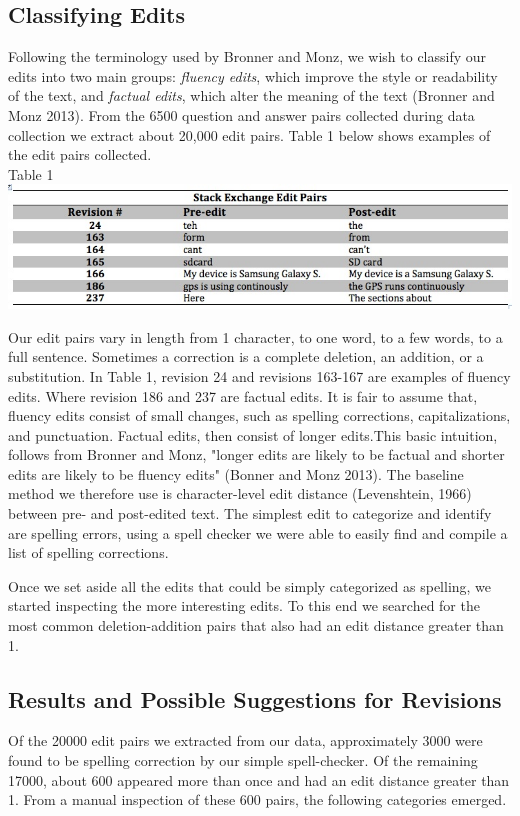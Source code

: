 \documentclass[11pt, oneside]{article}   	%
\begin{document}
\subsection{Classifying Edits} 
Following the terminology used by Bronner and Monz, we wish to classify our edits into two main groups:{ \itshape fluency edits}, which improve the style or readability of the text, and {\itshape factual edits}, which alter the meaning of the text (Bronner and Monz 2013).   From the 6500 question and answer pairs collected during data collection we extract about 20,000 edit pairs.  Table 1 below shows examples of the edit pairs collected. \\

\centering
Table 1
\includegraphics[width=\textwidth]{table1-editpairs}

\raggedright
Our edit pairs vary in length from 1 character, to one word, to a few words, to a full sentence. Sometimes a correction is a complete deletion, an addition, or a substitution. In Table 1, revision 24 and revisions 163-167 are examples of fluency edits. Where revision 186 and 237 are factual edits. It is fair to assume that, fluency edits consist of small changes, such as spelling corrections, capitalizations, and punctuation. Factual edits, then consist of longer edits.This basic intuition, follows from Bronner and Monz, "longer edits are likely to be factual and shorter edits are likely to be fluency edits" (Bonner and Monz 2013). The baseline method we therefore use is character-level edit distance (Levenshtein, 1966) between pre- and post-edited text. The simplest edit to categorize and identify are spelling errors, using a spell checker we were able to easily find and compile a list of spelling corrections.

Once we set aside all the edits that could be simply categorized as spelling, we started inspecting the more interesting edits. To this end we searched for the most common deletion-addition pairs that also had an edit distance greater than 1. 

\subsection{Results and Possible Suggestions for Revisions}
Of the 20000 edit pairs we extracted from our data, approximately 3000 were found to be spelling correction by our simple spell-checker. Of the remaining 17000, about 600 appeared more than once and had an edit distance greater than 1. From a manual inspection of these 600 pairs, the following categories emerged.
\newline
\end{document}
